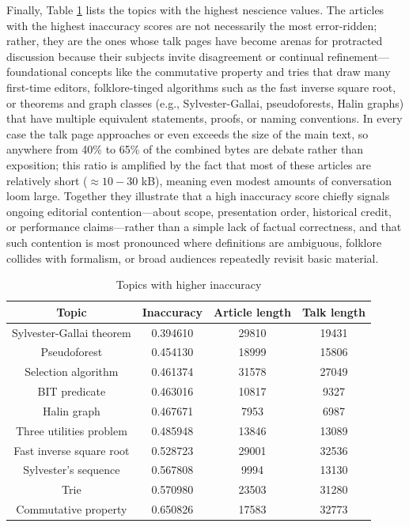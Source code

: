 Finally, Table \ref{tab:Higher-inaccuracy-of-topics} lists the topics with the highest nescience values. The articles with the highest inaccuracy scores are not necessarily the most error-ridden; rather, they are the ones whose talk pages have become arenas for protracted discussion because their subjects invite disagreement or continual refinement—foundational concepts like the commutative property and tries that draw many first-time editors, folklore-tinged algorithms such as the fast inverse square root, or theorems and graph classes (e.g., Sylvester-Gallai, pseudoforests, Halin graphs) that have multiple equivalent statements, proofs, or naming conventions.  In every case the talk page approaches or even exceeds the size of the main text, so anywhere from 40\% to 65\% of the combined bytes are debate rather than exposition; this ratio is amplified by the fact that most of these articles are relatively short ($\approx 10-30$ kB), meaning even modest amounts of conversation loom large.  Together they illustrate that a high inaccuracy score chiefly signals ongoing editorial contention—about scope, presentation order, historical credit, or performance claims—rather than a simple lack of factual correctness, and that such contention is most pronounced where definitions are ambiguous, folklore collides with formalism, or broad audiences repeatedly revisit basic material.

\begin{table}
\begin{centering}
\begin{tabular}{|c|c|c|c|}
\hline 
Topic & Inaccuracy & Article length & Talk length \tabularnewline
\hline 
\hline 
Sylvester-Gallai theorem & 0.394610 & 29810 & 19431 \tabularnewline
\hline
Pseudoforest & 0.454130 & 18999 & 15806 \tabularnewline
\hline
Selection algorithm & 0.461374 & 31578 & 27049 \tabularnewline
\hline
BIT predicate & 0.463016 & 10817 & 9327 \tabularnewline
\hline
Halin graph & 0.467671 & 7953 & 6987 \tabularnewline
\hline
Three utilities problem & 0.485948 & 13846 & 13089 \tabularnewline
\hline
Fast inverse square root & 0.528723 & 29001 & 32536 \tabularnewline
\hline
Sylvester's sequence & 0.567808 & 9994 & 13130 \tabularnewline
\hline
Trie & 0.570980 & 23503 & 31280 \tabularnewline
\hline
Commutative property & 0.650826 & 17583 & 32773 \tabularnewline
\hline 
\end{tabular}
\par\end{centering}
\caption{\label{tab:Higher-inaccuracy-of-topics}Topics with higher inaccuracy}
\end{table}

